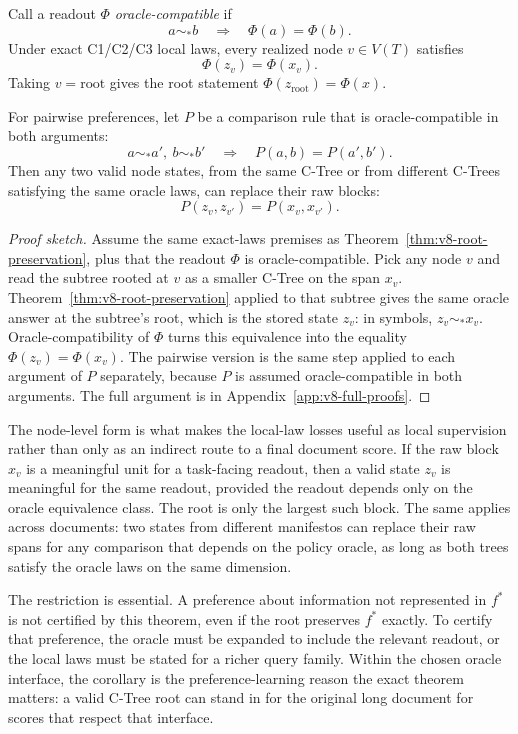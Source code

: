 \begin{corollary}
\label{cor:v8-preferences-pass-to-root}
Call a readout \(\Phi\) \emph{oracle-compatible} if
\[
  a\sim_\ast b \quad\Longrightarrow\quad \Phi(a)=\Phi(b).
\]
Under exact C1/C2/C3 local laws, every realized node \(v\in V(T)\) satisfies
\[
  \Phi(z_v)=\Phi(x_v).
\]
Taking \(v=\mathrm{root}\) gives the root statement
\(\Phi(z_{\mathrm{root}})=\Phi(x)\).

For pairwise preferences, let \(P\) be a comparison rule that is
oracle-compatible in both arguments:
\[
  a\sim_\ast a',\ b\sim_\ast b'
  \quad\Longrightarrow\quad
  P(a,b)=P(a',b').
\]
Then any two valid node states, from the same C-Tree or from different
C-Trees satisfying the same oracle laws, can replace their raw blocks:
\[
  P(z_v,z_{v'})=P(x_v,x_{v'}).
\]
\end{corollary}

\begin{proof}[Proof sketch]
Assume the same exact-laws premises as
Theorem~\ref{thm:v8-root-preservation}, plus that the readout
\(\Phi\) is oracle-compatible. Pick any node \(v\) and read the
subtree rooted at \(v\) as a smaller C-Tree on the span \(x_v\).
Theorem~\ref{thm:v8-root-preservation} applied to that subtree gives
the same oracle answer at the subtree's root, which is the stored
state \(z_v\): in symbols, \(z_v\sim_\ast x_v\). Oracle-compatibility
of \(\Phi\) turns this equivalence into the equality
\(\Phi(z_v)=\Phi(x_v)\). The pairwise version is the same step
applied to each argument of \(P\) separately, because \(P\) is
assumed oracle-compatible in both arguments. The full argument is in
Appendix~\ref{app:v8-full-proofs}.
\end{proof}

The node-level form is what makes the local-law losses useful as local
supervision rather than only as an indirect route to a final document score. If
the raw block \(x_v\) is a meaningful unit for a task-facing readout, then a
valid state \(z_v\) is meaningful for the same readout, provided the readout
depends only on the oracle equivalence class. The root is only the largest
such block. The same applies across documents: two states from
different manifestos can replace their raw spans for any comparison
that depends on the policy oracle, as long as both trees satisfy the
oracle laws on the same dimension.

The restriction is essential. A preference about information not represented in
\(f^\ast\) is not certified by this theorem, even if the root preserves
\(f^\ast\) exactly. To certify that preference, the oracle must be expanded to
include the relevant readout, or the local laws must be stated for a richer
query family. Within the chosen oracle interface, the corollary is the
preference-learning reason the exact theorem matters: a valid C-Tree root can
stand in for the original long document for scores that respect that interface.

